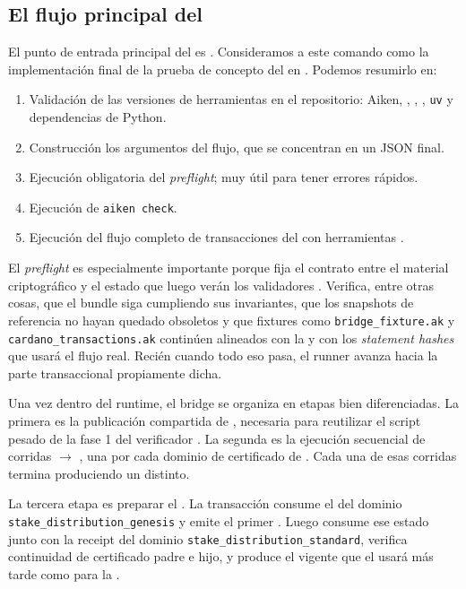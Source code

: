 \subsection{El flujo principal del \zkBridge}

El punto de entrada principal del \zkBridge es \BridgeRunStrictCommand. Consideramos a este comando como la implementación final de la prueba de concepto del \zkBridge en \Cardano. Podemos resumirlo en:

\begin{enumerate}[noitemsep]
  \item Validación de las versiones de herramientas en el repositorio: Aiken, \Trix, \CShell, \Dolos, \texttt{uv} y dependencias de Python.
  \item Construcción los argumentos \STM del flujo, que se concentran en un JSON final.
  \item Ejecución obligatoria del \textit{preflight}; muy útil para tener errores rápidos.
  \item Ejecución de \texttt{aiken check}.
  \item Ejecución del flujo completo de transacciones del \zkBridge con herramientas \TxThree.
\end{enumerate}

El \textit{preflight} es especialmente importante porque fija el contrato entre el material criptográfico \Offchain y el estado que luego verán los validadores \Onchain. Verifica, entre otras cosas, que el bundle \STM siga cumpliendo sus invariantes, que los snapshots de referencia no hayan quedado obsoletos y que fixtures como \texttt{bridge\_fixture.ak} y \texttt{cardano\_transactions.ak} continúen alineados con la \TxSetRoot y con los \textit{statement hashes} que usará el flujo real. Recién cuando todo eso pasa, el runner avanza hacia la parte transaccional propiamente dicha.

Una vez dentro del runtime, el bridge se organiza en etapas bien diferenciadas. La primera es la publicación compartida de \PublishPhaseOneReferenceScriptTx, necesaria para reutilizar el script pesado de la fase 1 del verificador \STM. La segunda es la ejecución secuencial de corridas \PhaseOneSetupTx $\rightarrow$ \PhaseTwoVerifyTx, una por cada dominio de certificado \STM de \Mithril. Cada una de esas corridas termina produciendo un \ProofReceipt distinto.

La tercera etapa es preparar el \StakeDistributionUTxO. La transacción \StakeDistributionGenesisTxTemplate consume el \UTxO del dominio \texttt{stake\_distribution\_genesis} y emite el primer \StakeDistributionUTxO. Luego \StakeDistributionStandardTxTemplate consume ese estado junto con la receipt del dominio \texttt{stake\_distribution\_standard}, verifica continuidad de certificado padre e hijo, y produce el \StakeDistributionUTxO vigente que el \zkBridge usará más tarde como \ReferenceInput para la \MintTx.


